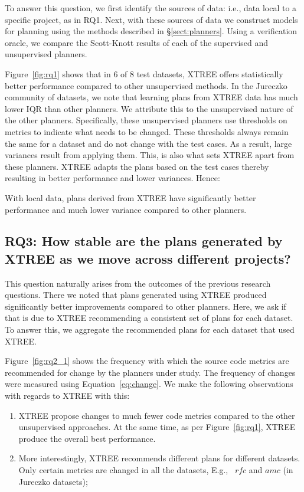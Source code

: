 \documentclass[10pt,journal,compsoc]{IEEEtran}
\newcommand{\be}{\begin{enumerate}}
\newcommand{\ee}{\end{enumerate}}
\newcommand{\tion}[1]{\S\ref{sect:#1}}
\newcommand{\fig}[1]{Figure~\ref{fig:#1}}
\newcommand{\eq}[1]{Equation~\ref{eq:#1}}
\begin{document}
To answer this question, we first identify the sources of data: i.e., data local to a specific project, as in RQ1. Next, with these sources of data we construct models for planning using the methods described in \tion{planners}. Using a verification oracle, we  compare the Scott-Knott results of each of the supervised and unsupervised planners. 

\fig{rq1} shows that in 6 of 8 test datasets, XTREE offers statistically better performance compared to other unsupervised methods. In the Jureczko community of datasets, we note that learning plans from XTREE data has much lower IQR than other planners. We attribute this to the unsupervised nature of the other planners. Specifically, these unsupervised planners use thresholds on metrics to indicate what needs to be changed. These thresholds always remain the same for a dataset and do not change with the test cases. As a result, large variances result from applying them. This, is also what sets XTREE apart from these planners. XTREE adapts the plans based on the test cases thereby resulting in better performance and lower variances. Hence:

\begin{lesson}
	With local data, plans derived from XTREE have significantly better performance and much lower variance compared to other planners.\\[-.2cm]
\end{lesson}



\subsection*{{\bf RQ3: How stable are the plans generated by XTREE as we move across different projects?}}

This question naturally arises from the outcomes of the previous research questions. There we noted that plans generated using XTREE produced significantly better improvements compared to other planners. Here, we ask if that is due to XTREE recommending a consistent set of plans for each dataset. To answer this, we aggregate the recommended plans for each dataset that used XTREE.  

Figure~\ref{fig:rq2_1} shows the frequency with which the source code metrics are recommended for change by the planners under study. The frequency of changes were measured using \eq{change}. We make the following observations with regards to XTREE with this: 
\be
\item XTREE propose changes to much fewer code metrics compared to the other unsupervised approaches. At the same time, as per \fig{rq1}, XTREE produce the overall best performance. 
\item More interestingly, XTREE recommends different plans for different datasets. Only certain metrics are changed in all the datasets, E.g., ~$rfc$ and $amc$ (in Jureczko datasets);
\ee
\end{document}
